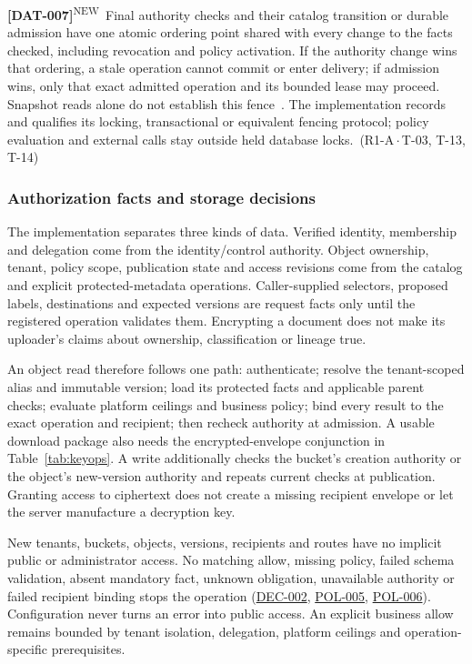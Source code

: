 \documentclass[11pt,a4paper]{article}
\newcommand{\rr}[1]{\hyperlink{req:#1}{#1}}
\newcommand{\reqtag}[2]{{\footnotesize\color{accent}(#1\,$\cdot$\,#2)}}
\newcommand{\reqn}[4]{\par\noindent\hypertarget{req:#1}{\textbf{[#1]}}\textsuperscript{\color{accent}\tiny NEW}\ #4\ \reqtag{#2}{#3}\par}
\begin{document}
\reqn{DAT-007}{R1-A}{T-03, T-13, T-14}{Final authority checks and their catalog transition or durable admission have one atomic ordering point shared with every change to the facts checked, including revocation and policy activation. If the authority change wins that ordering, a stale operation cannot commit or enter delivery; if admission wins, only that exact admitted operation and its bounded lease may proceed. Snapshot reads alone do not establish this fence~\cite{postgresIsolation}. The implementation records and qualifies its locking, transactional or equivalent fencing protocol; policy evaluation and external calls stay outside held database locks.}

\subsubsection{Authorization facts and storage decisions}
The implementation separates three kinds of data. Verified identity, membership and delegation come from the identity/control authority. Object ownership, tenant, policy scope, publication state and access revisions come from the catalog and explicit protected-metadata operations. Caller-supplied selectors, proposed labels, destinations and expected versions are request facts only until the registered operation validates them. Encrypting a document does not make its uploader's claims about ownership, classification or lineage true.

An object read therefore follows one path: authenticate; resolve the tenant-scoped alias and immutable version; load its protected facts and applicable parent checks; evaluate platform ceilings and business policy; bind every result to the exact operation and recipient; then recheck authority at admission. A usable download package also needs the encrypted-envelope conjunction in Table~\ref{tab:keyops}. A write additionally checks the bucket's creation authority or the object's new-version authority and repeats current checks at publication. Granting access to ciphertext does not create a missing recipient envelope or let the server manufacture a decryption key.

New tenants, buckets, objects, versions, recipients and routes have no implicit public or administrator access. No matching allow, missing policy, failed schema validation, absent mandatory fact, unknown obligation, unavailable authority or failed recipient binding stops the operation (\rr{DEC-002}, \rr{POL-005}, \rr{POL-006}). Configuration never turns an error into public access. An explicit business allow remains bounded by tenant isolation, delegation, platform ceilings and operation-specific prerequisites.
\end{document}

